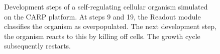 \begin{figure}[!ht]
  \quad
  \quad
  \quad
  \quad
  \quad
  \quad
  \caption[Self-regulating developing organism]{
    Development steps of a self-regulating cellular organism simulated on
    the CARP platform. At steps 9 and 19, the Readout module classifies the
    organism as overpopulated. The next development step, the organism reacts to
    this by killing off cells. The growth cycle subsequently restarts.
    \label{fig:example-development}
  }
\end{figure}
\cleardoublepage